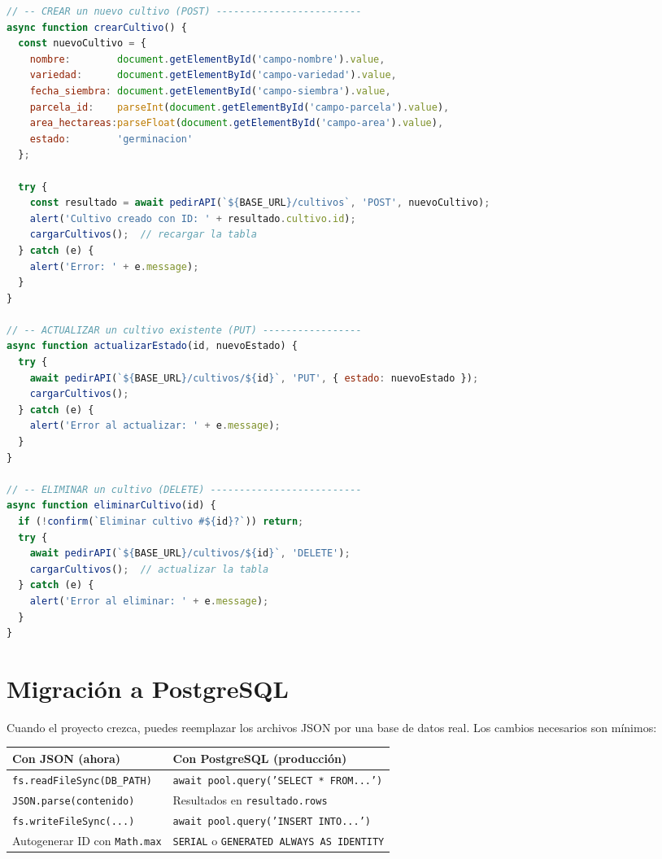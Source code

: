 \documentclass[12pt, a4paper]{article}
\begin{document}
\begin{tcolorbox}[codigoBox]
\begin{lstlisting}[style=jsStyle, language=JavaScript, morekeywords={async,await,const,let}]
// -- CREAR un nuevo cultivo (POST) -------------------------
async function crearCultivo() {
  const nuevoCultivo = {
    nombre:        document.getElementById('campo-nombre').value,
    variedad:      document.getElementById('campo-variedad').value,
    fecha_siembra: document.getElementById('campo-siembra').value,
    parcela_id:    parseInt(document.getElementById('campo-parcela').value),
    area_hectareas:parseFloat(document.getElementById('campo-area').value),
    estado:        'germinacion'
  };

  try {
    const resultado = await pedirAPI(`${BASE_URL}/cultivos`, 'POST', nuevoCultivo);
    alert('Cultivo creado con ID: ' + resultado.cultivo.id);
    cargarCultivos();  // recargar la tabla
  } catch (e) {
    alert('Error: ' + e.message);
  }
}

// -- ACTUALIZAR un cultivo existente (PUT) -----------------
async function actualizarEstado(id, nuevoEstado) {
  try {
    await pedirAPI(`${BASE_URL}/cultivos/${id}`, 'PUT', { estado: nuevoEstado });
    cargarCultivos();
  } catch (e) {
    alert('Error al actualizar: ' + e.message);
  }
}

// -- ELIMINAR un cultivo (DELETE) --------------------------
async function eliminarCultivo(id) {
  if (!confirm(`Eliminar cultivo #${id}?`)) return;
  try {
    await pedirAPI(`${BASE_URL}/cultivos/${id}`, 'DELETE');
    cargarCultivos();  // actualizar la tabla
  } catch (e) {
    alert('Error al eliminar: ' + e.message);
  }
}
\end{lstlisting}
\end{tcolorbox}

\section{Migración a PostgreSQL}

Cuando el proyecto crezca, puedes reemplazar los archivos JSON por una base de datos real. Los cambios necesarios son mínimos:

\begin{center}
\begin{tabular}{p{6cm} p{6.5cm}}
  \toprule
  \rowcolor{grisCl}
  \textbf{Con JSON (ahora)} & \textbf{Con PostgreSQL (producción)} \\
  \midrule
  \texttt{fs.readFileSync(DB\_PATH)} & \texttt{await pool.query('SELECT * FROM...')} \\
  \texttt{JSON.parse(contenido)}     & Resultados en \texttt{resultado.rows} \\
  \texttt{fs.writeFileSync(...)}     & \texttt{await pool.query('INSERT INTO...')} \\
  Autogenerar ID con \texttt{Math.max} & \texttt{SERIAL} o \texttt{GENERATED ALWAYS AS IDENTITY} \\
  \bottomrule
\end{tabular}
\end{center}
\end{document}
